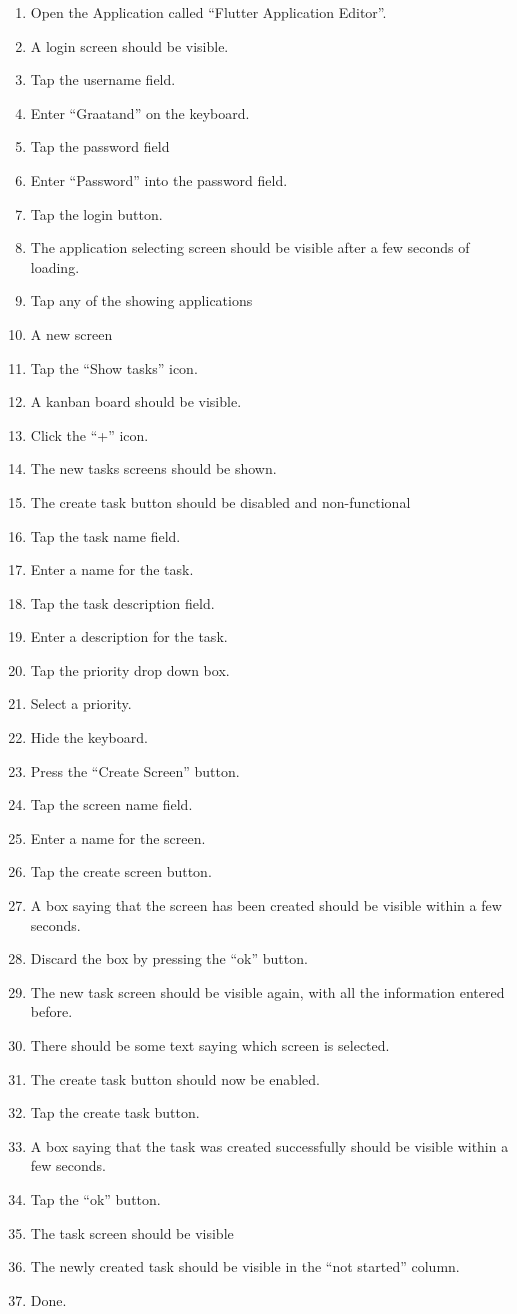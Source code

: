 \begin{enumerate}
    \item Open the Application called “Flutter Application Editor”.
    \item A login screen should be visible. 
    \item Tap the username field.
    \item Enter “Graatand” on the keyboard.
    \item Tap the password field
    \item Enter “Password” into the password field.
    \item Tap the login button.
    \item The application selecting screen should be visible after a few seconds of loading.
    \item Tap any of the showing applications
    \item A new screen 
    \item Tap the “Show tasks” icon.
    \item A kanban board should be visible.
    \item Click the “+” icon.
    \item The new tasks screens should be shown.
    \item The create task button should be disabled and non-functional 
    \item Tap the task name field.
    \item Enter a name for the task.
    \item Tap the task description field.
    \item Enter a description for the task.
    \item Tap the priority drop down box.
    \item Select a priority.
    \item Hide the keyboard.
    \item Press the “Create Screen” button.
    \item Tap the screen name field.
    \item Enter a name for the screen.
    \item Tap the create screen button.
    \item A box saying that the screen has been created should be visible within a few seconds.
    \item Discard the box by pressing the “ok” button.
    \item The new task screen should be visible again, with all the information entered before.
    \item There should be some text saying which screen is selected.
    \item The create task button should now be enabled.
    \item Tap the create task button.
    \item A box saying that the task was created successfully should be visible within a few seconds.
    \item Tap the “ok” button.
    \item The task screen should be visible
    \item The newly created task should be visible in the “not started” column.
    \item Done. 
\end{enumerate}
